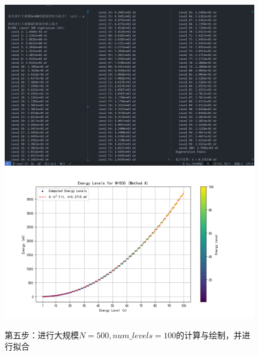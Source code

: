 \begin{figure}[H]
    \centering
    \includegraphics[width=1.0\textwidth]{Problem_1/figs/5_large.png}
    \includegraphics[width=1.0\textwidth]{Problem_1/figs/energy_levs_large.png}
    \caption{第五步：进行大规模$N=500,num\_levels=100$的计算与绘制，并进行拟合}
\end{figure}

